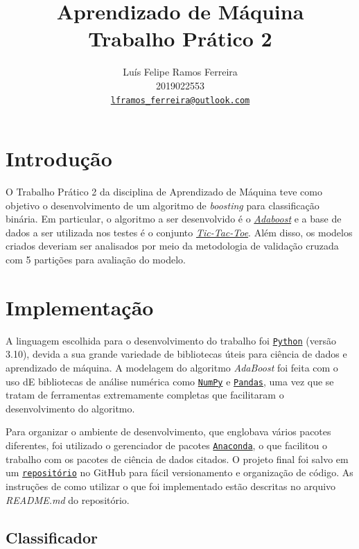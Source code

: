 \documentclass{article}
\title{Aprendizado de Máquina \\ Trabalho Prático 2}
\author{Luís Felipe Ramos Ferreira \\ 2019022553 \\
    \href{mailto:lframos_ferreira@outlook.com}{\texttt{lframos\_ferreira@outlook.com}}}
\begin{document}
\maketitle

\section{Introdução}

O Trabalho Prático 2 da disciplina de Aprendizado de Máquina teve como objetivo
o desenvolvimento de um algoritmo de \textit{boosting}
para classificação binária. Em particular, o algoritmo a ser desenvolvido é o
\href{https://en.wikipedia.org/wiki/AdaBoost}{\textit{Adaboost}} e a base de
dados a ser
utilizada nos testes é o conjunto
\href{https://archive.ics.uci.edu/ml/datasets/Tic-Tac-Toe+Endgame}{\textit{Tic-Tac-Toe}}.
Além disso, os modelos criados deveriam
ser analisados por meio da metodologia de validação cruzada com 5 partições
para avaliação do modelo.

\section{Implementação}

A linguagem escolhida para o desenvolvimento do trabalho foi
\href{https://www.python.org/}{\texttt{Python}} (versão 3.10), devida a sua
grande variedade de bibliotecas úteis para ciência de dados e aprendizado de
máquina.
A modelagem do algoritmo \textit{AdaBoost} foi feita com o uso dE bibliotecas
de análise numérica como \href{https://numpy.org/}{\texttt{NumPy}} e
\href{https://pandas.pydata.org/}{\texttt{Pandas}},
uma vez que se tratam de ferramentas extremamente completas que facilitaram o
desenvolvimento do algoritmo.

Para organizar o ambiente de desenvolvimento, que englobava vários pacotes
diferentes, foi utilizado o gerenciador de pacotes
\href{https://www.anaconda.com/}{\texttt{Anaconda}}, o que facilitou o trabalho
com os pacotes de ciência de dados citados. O projeto final foi salvo em um
\href{https://github.com/lframosferreira/boosting-process}{\texttt{repositório}}
no GitHub para fácil versionamento e organização de código. As instruções de
como
utilizar o que foi implementado estão descritas no arquivo \textit{README.md}
do repositório.

\subsection{Classificador}
\end{document}
